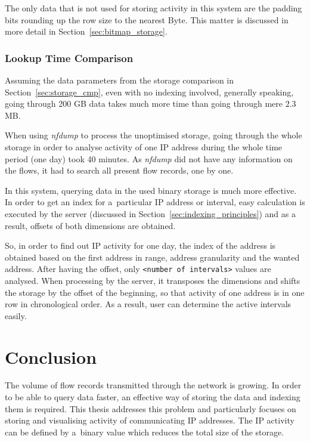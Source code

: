 The only data that is not used for storing activity in this system are the padding bits
rounding up the row size to the nearest Byte. This matter is discussed in
more detail in Section~\ref{sec:bitmap_storage}.

\subsection{Lookup Time Comparison}
Assuming the data parameters from the storage comparison in Section~\ref{sec:storage_cmp},
even with no indexing involved, generally speaking, going through 200 GB data takes much more time
than going through mere $2.3$ MB.

When using \textit{nfdump} to process the unoptimised storage, going through
the whole storage in order to analyse activity of one IP address during the
whole time period (one day) took 40 minutes. As \textit{nfdump} did not
have any information on the flows, it had to search all present flow records, one by one.

In this system, querying data in the used binary storage is much more effective.
In order to get an index for a~particular IP address or interval,
easy calculation is executed by the server (discussed in Section~\ref{sec:indexing_principles})
and as a result, offsets of both dimensions are obtained.

So, in order to find out IP activity for one day, the index of the address
is obtained based on the first address in range, address granularity and
the wanted address. After having the offset, only \texttt{<number of intervals>}
values are analysed. When processing by the server, it transposes the dimensions
and shifts the storage by the offset of the beginning, so that activity of
one address is in one row in chronological order. As a result, user can
determine the active intervals easily.

\csdoublequotesoff

\chapter{Conclusion}\label{sec:chapter6}
The volume of flow records transmitted through the network is growing.
In order to be able to query data faster, an effective way of storing
the data and indexing them is required. This thesis addresses this problem
and particularly focuses on storing and visualising activity of
communicating IP addresses. The IP activity can be defined by a~binary
value which reduces the total size of the storage.


